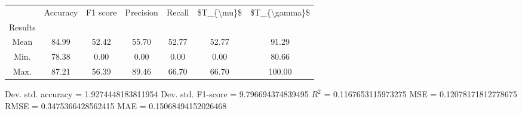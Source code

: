 \begin{tabular}{|c|c|c|c|c|c|c|}
\toprule
{} &  Accuracy &  F1 score &  Precision &  Recall &  \$T\_\{\textbackslash mu\}\$ &  \$T\_\{\textbackslash gamma\}\$ \\
Results &           &           &            &         &            &               \\
\hline
Mean    &     84.99 &     52.42 &      55.70 &   52.77 &      52.77 &         91.29 \\
Min.    &     78.38 &      0.00 &       0.00 &    0.00 &       0.00 &         80.66 \\
Max.    &     87.21 &     56.39 &      89.46 &   66.70 &      66.70 &        100.00 \\
\bottomrule
\end{tabular}

 Dev. std. accuracy = 1.9274448183811954
 Dev. std. F1-score = 9.796694374839495
 $R^2$ = 0.1167653115973275
 MSE = 0.12078171812778675
 RMSE = 0.3475366428562415
 MAE = 0.15068494152026468